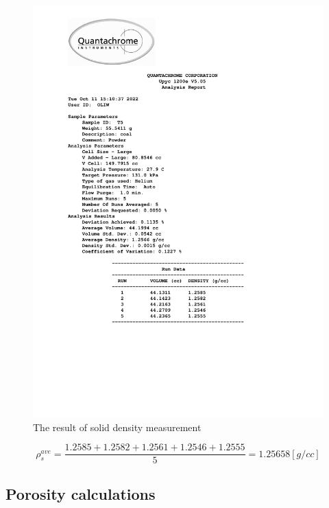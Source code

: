 \documentclass[a4paper,fleqn]{cas-dc}
\begin{document}
\begin{figure}[!h]
	\centering 
	\includegraphics[trim=2cm 6cm 4cm 0cm, clip,width=\columnwidth]{Sections/ultraReportT5.pdf}
	\caption{The result of solid density measurement}
	\label{fig:density_cal}
\end{figure}

{\footnotesize
	\begin{equation*}
		\rho_s^{ave} = \frac{1.2585+1.2582+1.2561+1.2546+1.2555}{5} = 1.25658 [g/cc]
	\end{equation*}
}

\subsection{Porosity calculations} \label{CH: Porosity}

\end{document}
